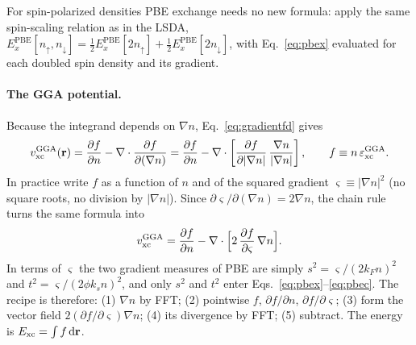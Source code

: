 For spin-polarized densities PBE exchange needs no new formula: apply the
same spin-scaling relation as in the LSDA,
$E_x^{\mathrm{PBE}}[n_\uparrow, n_\downarrow] = \tfrac12
E_x^{\mathrm{PBE}}[2n_\uparrow] + \tfrac12 E_x^{\mathrm{PBE}}[2n_\downarrow]$,
with Eq.~\eqref{eq:pbex} evaluated for each doubled spin density and its
gradient.

\paragraph{The GGA potential.} Because the integrand depends on $\nabla n$,
Eq.~\eqref{eq:gradientfd} gives
\begin{equation}
v_{\mathrm{xc}}^{\mathrm{GGA}}(\mathbf{r})
= \frac{\partial f}{\partial n}
- \nabla \cdot \frac{\partial f}{\partial (\nabla n)}
= \frac{\partial f}{\partial n}
- \nabla \cdot \left[\frac{\partial f}{\partial |\nabla n|}\,
\frac{\nabla n}{|\nabla n|}\right],
\qquad f \equiv n\,\varepsilon_{\mathrm{xc}}^{\mathrm{GGA}} .
\label{eq:vxcgga}
\end{equation}
In practice write $f$ as a function of $n$ and of the squared gradient
$\varsigma \equiv |\nabla n|^2$ (no square roots, no division by
$|\nabla n|$). Since $\partial\varsigma/\partial(\nabla n) = 2\nabla n$, the
chain rule turns the same formula into
\begin{equation}
v_{\mathrm{xc}}^{\mathrm{GGA}} = \frac{\partial f}{\partial n}
- \nabla\cdot\Big[2\,\frac{\partial f}{\partial \varsigma}\,\nabla n\Big].
\label{eq:vxcgga2}
\end{equation}
In terms of $\varsigma$ the two gradient measures of PBE are simply
$s^2 = \varsigma/(2k_Fn)^2$ and $t^2 = \varsigma/(2\phi k_s n)^2$, and only
$s^2$ and $t^2$ enter Eqs.~\eqref{eq:pbex}--\eqref{eq:pbec}.
The recipe is therefore: (1) $\nabla n$ by FFT; (2) pointwise $f$,
$\partial f/\partial n$, $\partial f/\partial\varsigma$; (3) form the vector
field $2(\partial f/\partial\varsigma)\nabla n$; (4) its divergence by FFT;
(5) subtract. The energy is $E_{\mathrm{xc}} = \int f\,\mathrm{d}\mathbf{r}$.
